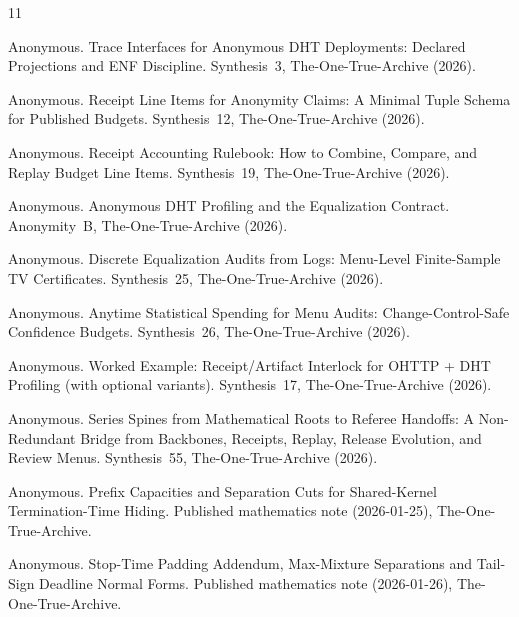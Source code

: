 \documentclass[11pt]{article}
\begin{document}

\begin{thebibliography}{11}

Anonymous.
\newblock Trace Interfaces for Anonymous DHT Deployments: Declared Projections and ENF Discipline.
\newblock Synthesis~3, The-One-True-Archive (2026).

Anonymous.
\newblock Receipt Line Items for Anonymity Claims: A Minimal Tuple Schema for Published Budgets.
\newblock Synthesis~12, The-One-True-Archive (2026).

Anonymous.
\newblock Receipt Accounting Rulebook: How to Combine, Compare, and Replay Budget Line Items.
\newblock Synthesis~19, The-One-True-Archive (2026).

Anonymous.
\newblock Anonymous DHT Profiling and the Equalization Contract.
\newblock Anonymity~B, The-One-True-Archive (2026).

Anonymous.
\newblock Discrete Equalization Audits from Logs: Menu-Level Finite-Sample TV Certificates.
\newblock Synthesis~25, The-One-True-Archive (2026).

Anonymous.
\newblock Anytime Statistical Spending for Menu Audits: Change-Control-Safe Confidence Budgets.
\newblock Synthesis~26, The-One-True-Archive (2026).

Anonymous.
\newblock Worked Example: Receipt/Artifact Interlock for OHTTP + DHT Profiling (with optional variants).
\newblock Synthesis~17, The-One-True-Archive (2026).

Anonymous.
\newblock Series Spines from Mathematical Roots to Referee Handoffs: A Non-Redundant Bridge from Backbones, Receipts, Replay, Release Evolution, and Review Menus.
\newblock Synthesis~55, The-One-True-Archive (2026).

Anonymous.
\newblock Prefix Capacities and Separation Cuts for Shared-Kernel Termination-Time Hiding.
\newblock Published mathematics note (2026-01-25), The-One-True-Archive.

Anonymous.
\newblock Stop-Time Padding Addendum, Max-Mixture Separations and Tail-Sign Deadline Normal Forms.
\newblock Published mathematics note (2026-01-26), The-One-True-Archive.

\end{thebibliography}
\end{document}
